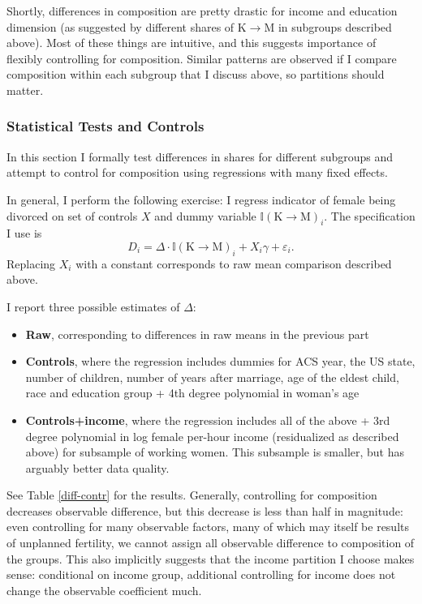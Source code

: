 \documentclass[12pt,letter]{article}
\newcommand{\I}{\mathbb{I}}
\begin{document}
Shortly, differences in composition are pretty drastic for income and education dimension (as suggested by different shares of K$\to$M in subgroups described above). Most of these things are intuitive, and this suggests importance of flexibly controlling for composition. Similar patterns are observed if I compare composition within each subgroup that I discuss above, so partitions should matter. 

\subsubsection{Statistical Tests and Controls}

In this section I formally test differences in shares for different subgroups and attempt to control for composition using regressions with many fixed effects.

In general, I perform the following exercise: I regress indicator of female being divorced on set of controls $X$ and dummy variable $\I(\text{K$\to$M})_i$. The specification I use is
\[D_i = \Delta \cdot \I(\text{K$\to$M})_i + X_i\gamma + \varepsilon_i.\]
Replacing $X_i$ with a constant corresponds to raw mean comparison described above. 

I report three possible estimates of $\Delta$:
\begin{itemize}
\item \textbf{Raw}, corresponding to differences in raw means in the previous part
\item \textbf{Controls}, where the regression includes dummies for ACS year, the US state, number of children, number of years after marriage, age of the eldest child, race and education group + 4th degree polynomial in woman's age
\item \textbf{Controls+income}, where the regression includes all of the above + 3rd degree polynomial in log female per-hour income (residualized as described above) for subsample of working women. This subsample is smaller, but has arguably better data quality.
\end{itemize}


See Table \ref{diff-contr} for the results. Generally, controlling for composition decreases observable difference, but this decrease is less than half in magnitude: even controlling for many observable factors, many of which may itself be results of unplanned fertility, we cannot assign all observable difference to composition of the groups. This also implicitly suggests that the income partition I choose makes sense: conditional on income group, additional controlling for income does not change the observable coefficient much. 
\end{document}
